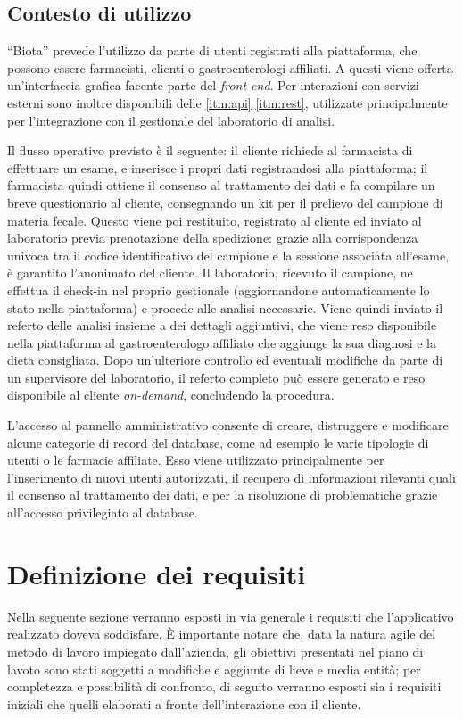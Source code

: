 \subsection{Contesto di utilizzo}
``Biota'' prevede l'utilizzo da parte di utenti registrati alla piattaforma, che possono essere farmacisti, clienti o gastroenterologi affiliati. A questi viene offerta un'interfaccia grafica facente parte del \textit{front end}. Per interazioni con servizi esterni sono inoltre disponibili delle \ref{itm:api} \ref{itm:rest}, utilizzate principalmente per l'integrazione con il gestionale del laboratorio di analisi. 

Il flusso operativo previsto è il seguente: il cliente richiede al farmacista di effettuare un esame, e inserisce i propri dati registrandosi alla piattaforma; il farmacista quindi ottiene il consenso al trattamento dei dati e fa compilare un breve questionario al cliente, consegnando un kit per il prelievo del campione di materia fecale. Questo viene poi restituito, registrato al cliente ed inviato al laboratorio previa prenotazione della spedizione: grazie alla corrispondenza univoca tra il codice identificativo del campione e la sessione associata all'esame, è garantito l'anonimato del cliente. Il laboratorio, ricevuto il campione, ne effettua il check-in nel proprio gestionale (aggiornandone automaticamente lo stato nella piattaforma) e procede alle analisi necessarie. Viene quindi inviato il referto delle analisi insieme a dei dettagli aggiuntivi, che viene reso disponibile nella piattaforma al gastroenterologo affiliato che aggiunge la sua diagnosi e la dieta consigliata. Dopo un'ulteriore controllo ed eventuali modifiche da parte di un supervisore del laboratorio, il referto completo può essere generato e reso disponibile al cliente \textit{on-demand}, concludendo la procedura.

L'accesso al pannello amministrativo consente di creare, distruggere e modificare alcune categorie di record del database, come ad esempio le varie tipologie di utenti o le farmacie affiliate. Esso viene utilizzato principalmente per l'inserimento di nuovi utenti autorizzati, il recupero di informazioni rilevanti quali il consenso al trattamento dei dati, e per la risoluzione di problematiche grazie all'accesso privilegiato al database.

\section{Definizione dei requisiti}
Nella seguente sezione verranno esposti in via generale i requisiti che l'applicativo realizzato doveva soddisfare. È importante notare che, data la natura agile del metodo di lavoro impiegato dall'azienda, gli obiettivi presentati nel piano di lavoto sono stati soggetti a modifiche e aggiunte di lieve e media entità; per completezza e possibilità di confronto, di seguito verranno esposti sia i requisiti iniziali che quelli elaborati a fronte dell'interazione con il cliente.
